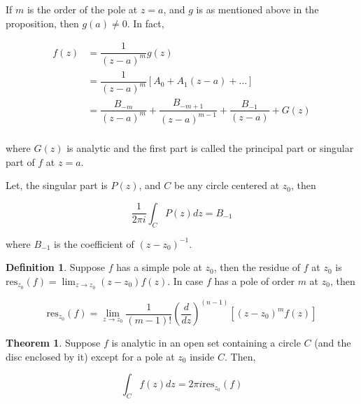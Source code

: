 \documentclass[12pt]{article}
\theoremstyle{definition}
\newtheorem{thm}{Theorem}
\newtheorem{defn}{Definition}
\newenvironment{definition}{
\begin{tcolorbox}[colback=green!5!white,colframe=green!75!black, parbox = false]\begin{defn} }{\end{defn}\end{tcolorbox} }
\newenvironment{theorem}{
\begin{tcolorbox}[colback=green!5!white,colframe=green!75!black, parbox = false]\begin{thm} }{\end{thm}\end{tcolorbox} }
\newenvironment{note}{
\begin{tcolorbox}[colback=blue!5!white,colframe=blue!75!black,title=Note, parbox = false] }{\end{tcolorbox} }
\begin{document}
\begin{note}
    If $m$ is the order of the pole at $z = a$, and $g$ is as mentioned above in the proposition, then $g(a) \neq 0$. In fact,

    \begin{align*}
        f(z)
        & = \dfrac{1}{(z - a)^m} g(z)\\
        & = \dfrac{1}{(z - a)^m} \left[ A_0 + A_1 (z - a) + \dots \right]\\
        & = \dfrac{B_{-m}}{(z - a)^m} + \dfrac{B_{-m+1}}{(z - a)^{m-1}} + \dfrac{B_{-1}}{(z - a)} + G(z)\\
    \end{align*}

    where $G(z)$ is analytic and the first part is called the principal part or singular part of $f$ at $z = a$.
\end{note}


Let, the singular part is $P(z)$, and $C$ be any circle centered at $z_0$, then 

$$
\dfrac{1}{2\pi i} \int_C P(z)dz = B_{-1}
$$

where $B_{-1}$ is the coefficient of $(z - z_0)^{-1}$. 

\begin{definition}
    Suppose $f$ has a simple pole at $z_0$, then the residue of $f$ at $z_0$ is $\text{res}_{z_0}(f) = \lim_{z \rightarrow z_0}(z - z_0)f(z)$. In case $f$ has a pole of order $m$ at $z_0$, then 

    $$
    \text{res}_{z_0}(f) = \lim_{z \rightarrow z_0} \dfrac{1}{(m-1)!} \left(\dfrac{d}{dz}\right)^{(n-1)} \left[ (z - z_0)^m f(z) \right]
    $$    
\end{definition}

\begin{theorem}
    Suppose $f$ is analytic in an open set containing a circle $C$ (and the disc enclosed by it) except for a pole at $z_0$ inside $C$. Then,

    $$
    \int_C f(z)dz = 2\pi i \text{res}_{z_0}(f)
    $$
\end{theorem}
\end{document}
